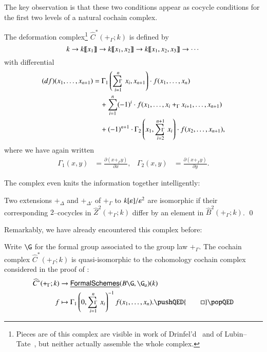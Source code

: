 The key observation is that these two conditions appear as cocycle conditions for the first two levels of a natural cochain complex.
\begin{definition}\label{DeformationComplex}
The deformation complex\footnote{Pieces are of this complex are visible in work of Drinfel'd~\cite[Section 4.A]{Drinfeld} and of Lubin--Tate~\cite{LubinTate}, but neither actually assemble the whole complex.} $\widehat C^*(+_\Gamma; k)$ is defined by \[k \to k\llbracket{x_1}\rrbracket \to k\llbracket{x_1, x_2}\rrbracket \to k\llbracket{x_1, x_2, x_3}\rrbracket \to \cdots\] with differential
\begin{align*}
(df)(x_1, \ldots, x_{n+1}) & = \Gamma_1\left(\sumGamma_{i=1}^n x_i, x_{n+1} \right) \cdot f(x_1, \ldots, x_n) \\
& \quad + \sum_{i=1}^n (-1)^i \cdot f(x_1, \ldots, x_i +_\Gamma x_{i+1}, \ldots, x_{n+1}) \\
& \quad + (-1)^{n+1} \cdot \Gamma_2\left(x_1, \sumGamma_{i=2}^{n+1} x_i \right) \cdot f(x_2, \ldots, x_{n+1}),
\end{align*}
where we have again written
\begin{align*}
\Gamma_1(x, y) & = \frac{\partial(x +_\Gamma y)}{\partial x}, &
\Gamma_2(x, y) & = \frac{\partial(x +_\Gamma y)}{\partial y}.
\end{align*}
\end{definition}

The complex even knits the information together intelligently:

\begin{corollary}\label{InterpretLTCoboundaries}
Two extensions $+_\Delta$ and $+_{\Delta'}$ of $+_\Gamma$ to $k[\varepsilon] / \varepsilon^2$ are isomorphic if their corresponding $2$--cocycles in $\widehat{Z}^2(+_\Gamma; k)$ differ by an element in $\widehat B^2(+_\Gamma; k)$. \qed
\end{corollary}

Remarkably, we have already encountered this complex before:

\begin{lemma}\label{LazarevComparisonOfCplxes}
Write $\G$ for the formal group associated to the group law $+_\Gamma$.  The cochain complex $\widehat C^*(+_\Gamma; k)$ is quasi-isomorphic to the cohomology cochain complex considered in the proof of :
\begin{align*}
\widehat C^*(+_\Gamma; k) & \to \InternalHom{FormalSchemes}(B\G, \G_a)(k) \\
f & \mapsto \Gamma_1\left(0, \sumGamma_{i=1}^n x_i \right)^{-1} f(x_1, \ldots, x_n). \pushQED{\qed}\qedhere\popQED
\end{align*}
\end{lemma}

